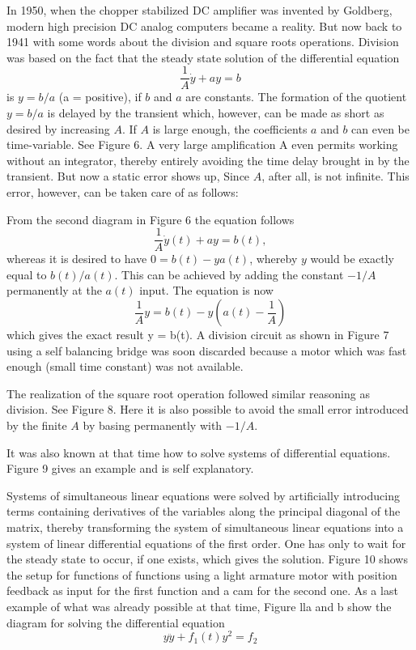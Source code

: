\documentclass[11pt, a4paper]{article}
\begin{document}
In 1950, when the chopper stabilized DC amplifier was invented by Goldberg, modern high precision DC analog computers became a reality. But now back to 1941 with some words about the division and square roots operations. Division was based on the fact that the steady state solution of the differential equation
$$
  \dfrac{1}{A}\dot{y}+ay=b
$$
is $y=b/a$ (a = positive), if $b$ and $a$ are constants. The formation of the quotient $y=b/a$ is delayed by the transient which, however, can be made as short as desired by increasing $A$. If $A$ is large enough, the coefficients $a$ and $b$ can even be time-variable. See Figure 6. A very large amplification A even permits working without an integrator, thereby entirely avoiding the time delay brought in by the transient. But now a static error shows up, Since $A$, after all, is not infinite. This error, however, can be taken care of as follows:

From the second diagram in Figure 6 the equation follows
$$
  \dfrac{1}{A}\dot{y}(t)+ay=b(t),
$$
whereas it is desired to have $0=b(t)-ya(t)$, whereby $y$ would be exactly equal to $b(t)/a(t)$. This can be achieved by adding the constant $-1/A$ permanently at the $a(t)$ input. The equation is now
$$
  \dfrac{1}{A}y=b(t)-y\left(a(t)-\dfrac{1}{A}\right)
$$
which gives the exact result y = b(t). A division circuit as shown in Figure 7 using a self balancing bridge was soon discarded because a motor which was fast enough (small time constant) was not available.

The realization of the square root operation followed similar reasoning as division. See Figure 8. Here it is also possible to avoid the small error introduced by the finite $A$ by basing permanently with $-1/A$.

It was also known at that time how to solve systems of differential equations. Figure 9 gives an example and is self explanatory.

Systems of simultaneous linear equations were solved by artificially introducing terms containing derivatives of the variables along the principal diagonal of the matrix, thereby transforming the system of simultaneous linear equations into a system of linear differential equations of the first order. One has only to wait for the steady state to occur, if one exists, which gives the solution. Figure 10 shows the setup for functions of functions using a light armature motor with position feedback as input for the first function and a cam for the second one. As a last example of what was already possible at that time, Figure lla and b show the diagram for solving the differential equation
$$
 y\ddot{y}+f_{1}(t)y^{2}=f_{2}
$$
\end{document}
